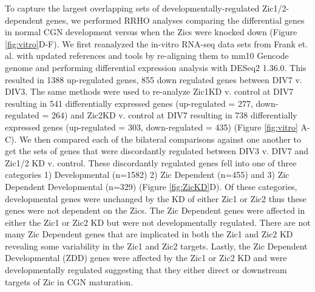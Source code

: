 \documentclass[fleqn,10pt]{wlscirep}
\begin{document}
To capture the largest overlapping sets of developmentally-regulated Zic1/2-dependent genes, we performed RRHO analyses comparing the differential genes in normal CGN development versus when the Zics were knocked down  (Figure \ref{fig:vitro}D-F). We first reanalyzed the in-vitro RNA-seq data sets from Frank et. al. \cite{Frank2015RegulationCerebellum} with updated references and tools by re-aligning them to mm10 Gencode genome and performing differential expression analysis with DESeq2 1.36.0. This resulted in 1388 up-regulated genes, 855 down regulated genes between DIV7 v. DIV3. The same methods were used to re-analyze Zic1KD v. control at DIV7 resulting in 541 differentially expressed genes (up-regulated = 277, down-regulated = 264) and Zic2KD v. control at DIV7 resulting in 738 differentially expressed genes (up-regulated = 303, down-regulated = 435) (Figure \ref{fig:vitro} A-C). We then compared each of the bilateral comparisons against one another to get the sets of genes that were discordantly regulated between DIV3 v. DIV7 and Zic1/2 KD v. control. These discordantly regulated genes fell into one of three categories 1) Developmental (n=1582) 2) Zic Dependent (n=455) and 3) Zic Dependent Developmental (n=329) (Figure \ref{fig:ZicKD}D). Of these categories, developmental genes were unchanged by the KD of either Zic1 or Zic2 thus these genes were not dependent on the Zics. The Zic Dependent genes  were affected in either the Zic1 or Zic2 KD but were not developmentally regulated. There are not many Zic Dependent genes that are implicated in both the Zic1 and Zic2 KD revealing some variability in the Zic1 and Zic2 targets. Lastly, the Zic Dependent Developmental (ZDD)  genes were affected by the Zic1 or Zic2 KD and were developmentally regulated suggesting that they either direct or downstream targets of Zic in CGN maturation. 
\end{document}
